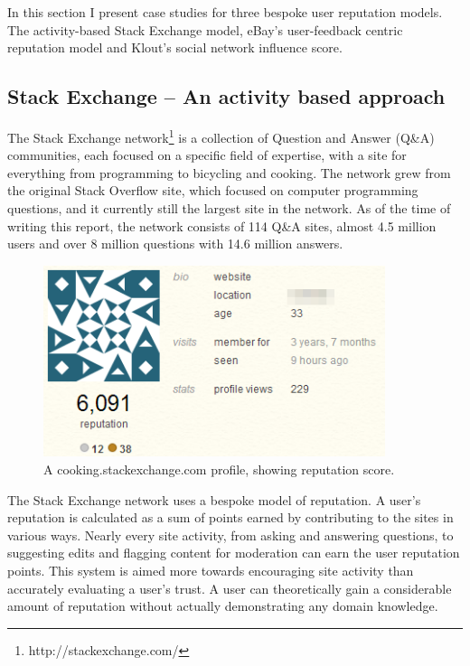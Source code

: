 \documentclass[]{final_report}
\begin{document}
In this section I present case studies for three bespoke user reputation models. The activity-based Stack Exchange model, eBay's user-feedback centric reputation model and Klout's social network influence score.

\subsection{Stack Exchange -- An activity based approach}

The Stack Exchange network\footnote{http://stackexchange.com/} is a collection of Question and Answer (Q\&A) communities, each focused on a specific field of expertise, with a site for everything from programming to bicycling and cooking. The network grew from the original Stack Overflow site, which focused on computer programming questions, and it currently still the largest site in the network. As of the time of writing this report, the network consists of 114 Q\&A sites, almost 4.5 million users and over 8 million questions with 14.6 million answers.

\begin{figure}[ht!]
\centering
\includegraphics[width=100mm]{serep.png}
\caption{A cooking.stackexchange.com profile, showing reputation score.}
\end{figure}

The Stack Exchange network uses a bespoke model of reputation. A user's reputation is calculated as a sum of points earned by contributing to the sites in various ways. Nearly every site activity, from asking and answering questions, to suggesting edits and flagging content for moderation can earn the user reputation points. This system is aimed more towards encouraging site activity than accurately evaluating a user's trust. A user can theoretically gain a considerable amount of reputation without actually demonstrating any domain knowledge.
\end{document}
